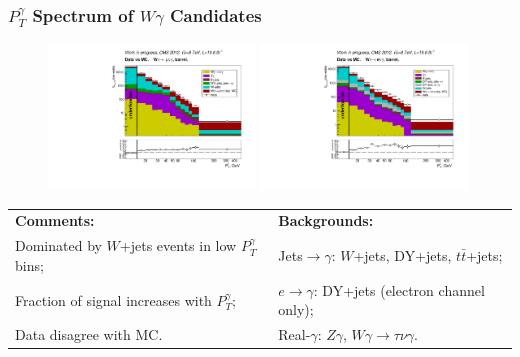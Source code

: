 \begin{frame}\frametitle{$P_T^{\gamma}$ Spectrum of $W\gamma$ Candidates}
  \begin{figure}[htb]
    \begin{center}
       \includegraphics[width=0.49\textwidth]{../figs/figs_v11/MUON_WGamma/PrepareYields/c_TotalDATAvsMC_Barrel__phoEt.pdf} \includegraphics[width=0.49\textwidth]{../figs/figs_v11/ELECTRON_WGamma/PrepareYields/c_TotalDATAvsMC_Barrel__phoEt.pdf} 
    \end{center}
  \end{figure}

\tiny
  \begin{table}[h]
     \tiny
     \begin{center}
     \begin{tabular}{|l|l|}
     \hline
     {\color{gray}\bfseries{Comments:}} &  {\bfseries{ Backgrounds:}}\\ 
     {\color{gray}Dominated by $W$+jets events in low $P_T^{\gamma}$ bins;} & Jets$\rightarrow\gamma$: $W$+jets, DY+jets, $t\bar{t}$+jets;\\
     {\color{gray}Fraction of signal increases with $P_T^{\gamma}$;} & $e\rightarrow\gamma$: DY+jets (electron channel only);\\
     {\color{gray}Data disagree with MC. }         & Real-$\gamma$: $Z\gamma$, $W\gamma\rightarrow\tau\nu\gamma$.\\
     \hline
      \end{tabular}
      \end{center}
  \end{table}

\end{frame}


